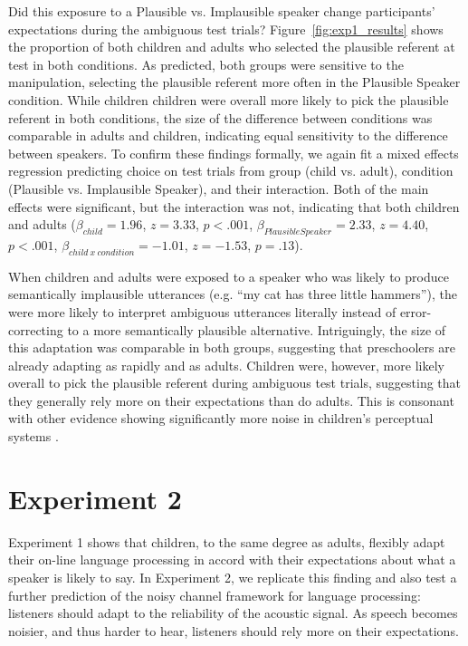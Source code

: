\documentclass[man,floatsintext]{apa6}
\begin{document}
Did this exposure to a Plausible vs. Implausible speaker change participants' expectations during the ambiguous test trials? Figure~\ref{fig:exp1_results} shows the proportion of both children and adults who selected the plausible referent at test in both conditions. As predicted, both groups were sensitive to the manipulation, selecting the plausible referent more often in the Plausible Speaker condition. While children children were overall more likely to pick the plausible referent in both conditions, the size of the difference between conditions was comparable in adults and children, indicating equal sensitivity to the difference between speakers. To confirm these findings formally, we again fit a mixed effects regression predicting choice on test trials from group (child vs. adult), condition (Plausible vs. Implausible Speaker), and their interaction. Both of the main effects were significant, but the interaction was not, indicating that both children and adults  ($\beta_{child} = 1.96$,  $z = 3.33$, $p <.001$, $\beta_{Plausible Speaker} = 2.33$,  $z = 4.40$, $p <.001$,  $\beta_{child \: x \: condition} = -1.01$,  $z = -1.53$, $p = .13$).

When children and adults were exposed to a speaker who was likely to produce semantically implausible utterances (e.g. ``my cat has three little hammers''), the were more likely to interpret ambiguous utterances literally instead of error-correcting to a more semantically plausible alternative. Intriguingly, the size of this adaptation was comparable in both groups, suggesting that preschoolers are already adapting as rapidly and as adults. Children were, however, more likely overall to pick the plausible referent during ambiguous test trials, suggesting that they generally rely more on their expectations than do adults. This is consonant with other evidence showing significantly more noise in children's perceptual systems \cite{neuman1983}.

\section{Experiment 2}

Experiment 1 shows that children, to the same degree as adults, flexibly adapt their on-line language processing in accord with their expectations about what a speaker is likely to say. In Experiment 2, we replicate this finding and also test a further prediction of the noisy channel framework for language processing: listeners should adapt to the reliability of the acoustic signal. As speech becomes noisier, and thus harder to hear, listeners should rely more on their expectations. 
\end{document}
